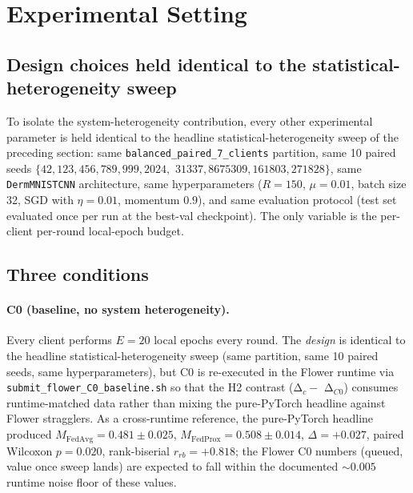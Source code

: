 \documentclass[11pt,a4paper]{article}
\newif\ifshowtodosh
\newcommand{\TODOhpcSH}[1]{%
  \ifshowtodosh\textcolor{red}{\textbf{[SH-HPC: #1]}}\else#1\fi}
\begin{document}
\section{Experimental Setting}

\subsection{Design choices held identical to the statistical-heterogeneity sweep}

To isolate the system-heterogeneity contribution, every other experimental
parameter is held identical to the headline statistical-heterogeneity
sweep of the preceding section: same \texttt{balanced\_paired\_7\_clients}
partition, same 10 paired seeds $\{42, 123, 456, 789, 999, 2024,$
$31337, 8675309, 161803, 271828\}$, same \texttt{DermMNISTCNN}
architecture, same hyperparameters ($R = 150$, $\mu = 0.01$, batch size
32, SGD with $\eta = 0.01$, momentum $0.9$), and same evaluation
protocol (test set evaluated once per run at the best-val checkpoint).
The only variable is the per-client per-round local-epoch budget.

\subsection{Three conditions}

\paragraph{C0 (baseline, no system heterogeneity).} Every client performs
$E = 20$ local epochs every round. The \emph{design} is identical to
the headline statistical-heterogeneity sweep (same partition, same 10
paired seeds, same hyperparameters), but C0 is re-executed in the
Flower runtime via \texttt{submit\_flower\_C0\_baseline.sh} so that
the H2 contrast (Δ$_c -$ Δ$_{C0}$) consumes runtime-matched data
rather than mixing the pure-PyTorch headline against Flower stragglers.
As a cross-runtime reference, the pure-PyTorch headline produced
$M_\text{FedAvg} = 0.481 \pm 0.025$, $M_\text{FedProx} = 0.508 \pm 0.014$,
$\Delta = +0.027$, paired Wilcoxon $p = 0.020$, rank-biserial
$r_{rb} = +0.818$; the Flower C0 numbers (queued, \TODOhpcSH{value once
sweep lands}) are expected to fall within the documented $\sim 0.005$
runtime noise floor of these values.
\end{document}
